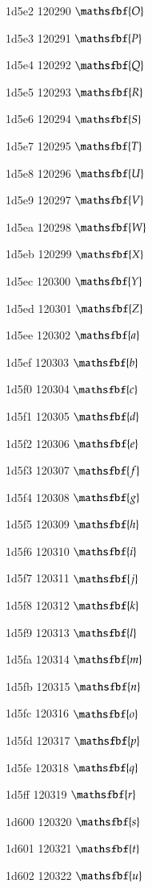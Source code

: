 \documentclass[11pt]{article}
\begin{document}
1d5e2 120290 \ensuremath{\mathsfbf{O}}

1d5e3 120291 \ensuremath{\mathsfbf{P}}

1d5e4 120292 \ensuremath{\mathsfbf{Q}}

1d5e5 120293 \ensuremath{\mathsfbf{R}}

1d5e6 120294 \ensuremath{\mathsfbf{S}}

1d5e7 120295 \ensuremath{\mathsfbf{T}}

1d5e8 120296 \ensuremath{\mathsfbf{U}}

1d5e9 120297 \ensuremath{\mathsfbf{V}}

1d5ea 120298 \ensuremath{\mathsfbf{W}}

1d5eb 120299 \ensuremath{\mathsfbf{X}}

1d5ec 120300 \ensuremath{\mathsfbf{Y}}

1d5ed 120301 \ensuremath{\mathsfbf{Z}}

1d5ee 120302 \ensuremath{\mathsfbf{a}}

1d5ef 120303 \ensuremath{\mathsfbf{b}}

1d5f0 120304 \ensuremath{\mathsfbf{c}}

1d5f1 120305 \ensuremath{\mathsfbf{d}}

1d5f2 120306 \ensuremath{\mathsfbf{e}}

1d5f3 120307 \ensuremath{\mathsfbf{f}}

1d5f4 120308 \ensuremath{\mathsfbf{g}}

1d5f5 120309 \ensuremath{\mathsfbf{h}}

1d5f6 120310 \ensuremath{\mathsfbf{i}}

1d5f7 120311 \ensuremath{\mathsfbf{j}}

1d5f8 120312 \ensuremath{\mathsfbf{k}}

1d5f9 120313 \ensuremath{\mathsfbf{l}}

1d5fa 120314 \ensuremath{\mathsfbf{m}}

1d5fb 120315 \ensuremath{\mathsfbf{n}}

1d5fc 120316 \ensuremath{\mathsfbf{o}}

1d5fd 120317 \ensuremath{\mathsfbf{p}}

1d5fe 120318 \ensuremath{\mathsfbf{q}}

1d5ff 120319 \ensuremath{\mathsfbf{r}}

1d600 120320 \ensuremath{\mathsfbf{s}}

1d601 120321 \ensuremath{\mathsfbf{t}}

1d602 120322 \ensuremath{\mathsfbf{u}}
\end{document}
